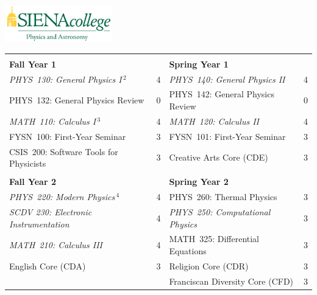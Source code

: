 \documentclass[12pt]{article}
\begin{document}
\hfill \includegraphics[width=0.35\textwidth]{siena_phys_astro_print_crop.jpg}

\vspace{0.1cm}
\vspace{0.3cm}

\vspace*{-5mm}
\begin{table}[h!]
\begin{center}
{\renewcommand{\arraystretch}{1.2}
\begin{tabular*}{0.9\textwidth}{@{\extracolsep{\fill}}lclc}
 & \\
{\Large \textbf{Fall Year 1}} & & {\Large \textbf{Spring Year 1}} & \\
\hline
{\em PHYS~130: General Physics I}\,$^{2}$  & 4 & {\em PHYS~140: General Physics II}     & 4 \\
PHYS~132: General Physics Review           & 0 & PHYS~142: General Physics Review & 0\\
{\em MATH~110: Calculus I}\,$^{3}$         & 4 & {\em MATH~120: Calculus II}            & 4 \\
FYSN~100: First-Year Seminar               & 3 & FYSN~101: First-Year Seminar     & 3\\
CSIS~200: Software Tools for Physicists    & 3 & Creative Arts Core (CDE)         & 3 \\

 & \\
{\Large \textbf{Fall Year 2}} & & {\Large \textbf{Spring Year 2}} & \\
\hline
{\em PHYS~220: Modern Physics}\,$^{4}$      & 4 & PHYS~260: Thermal Physics        & 3 \\
{\em SCDV 230: Electronic Instrumentation} & 4 & {\em PHYS~250: Computational Physics} & 3  \\
{\em MATH~210: Calculus III}               & 4 & MATH~325: Differential Equations & 3 \\
English Core (CDA)                         & 3 & Religion Core (CDR)            & 3 \\
                                           &   & Franciscan Diversity Core (CFD)  & 3 \\


\end{tabular*}}
\end{center}
\end{table}
\end{document}
